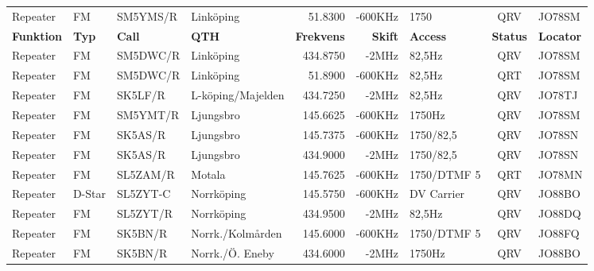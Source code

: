 \begin{landscape}
\begin{longtable}{llllrrlcl}
	Repeater          & FM           & SM5YMS/R      & Linköping         &           51.8300 &        -600KHz & 1750            &       QRV       & JO78SM           \\
		\textbf{Funktion} & \textbf{Typ} & \textbf{Call} & \textbf{QTH}        & \textbf{Frekvens} & \textbf{Skift} & \textbf{Access} & \textbf{Status} & \textbf{Locator} \\ \hline
	Repeater          & FM           & SM5DWC/R      & Linköping         &          434.8750 &          -2MHz & 82,5Hz          &       QRV       & JO78SM           \\
	Repeater          & FM           & SM5DWC/R      & Linköping         &           51.8900 &        -600KHz & 82,5Hz          &       QRT       & JO78SM           \\
	Repeater          & FM           & SK5LF/R       & L-köping/Majelden &          434.7250 &          -2MHz & 82,5Hz          &       QRV       & JO78TJ           \\
	Repeater          & FM           & SM5YMT/R      & Ljungsbro         &          145.6625 &        -600KHz & 1750Hz          &       QRV       & JO78SM           \\
	Repeater          & FM           & SK5AS/R       & Ljungsbro         &          145.7375 &        -600KHz & 1750/82,5       &       QRV       & JO78SN           \\
	Repeater          & FM           & SK5AS/R       & Ljungsbro         &          434.9000 &          -2MHz & 1750/82,5       &       QRV       & JO78SN           \\
	Repeater          & FM           & SL5ZAM/R      & Motala            &          145.7625 &        -600KHz & 1750/DTMF 5     &       QRT       & JO78MN           \\
	Repeater          & D-Star       & SL5ZYT-C      & Norrköping        &          145.5750 &        -600KHz & DV Carrier      &       QRV       & JO88BO           \\
	Repeater          & FM           & SL5ZYT/R      & Norrköping        &          434.9500 &          -2MHz & 82,5Hz          &       QRV       & JO88DQ           \\
	Repeater          & FM           & SK5BN/R       & Norrk./Kolmården  &          145.6000 &        -600KHz & 1750/DTMF 5     &       QRV       & JO88FQ           \\
	Repeater          & FM           & SK5BN/R       & Norrk./Ö. Eneby   &          434.6000 &          -2MHz & 1750Hz          &       QRV       & JO88BO           \\

\end{longtable}
\end{landscape}
